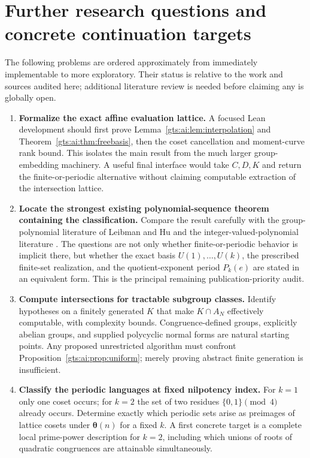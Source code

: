 \documentclass[11pt,letterpaper]{article}
\theoremstyle{definition}
\theoremstyle{remark}
\newcommand{\vv}{\boldsymbol\theta}
\begin{document}
\section{Further research questions and concrete continuation targets}\label{gts:ai:sec:questions}
The following problems are ordered approximately from immediately implementable to more exploratory. Their status is relative to the work and sources audited here; additional literature review is needed before claiming any is globally open.
\begin{enumerate}[label=\textbf{\arabic*.},leftmargin=*]
\item \textbf{Formalize the exact affine evaluation lattice.}
A focused Lean development should first prove Lemma~\ref{gts:ai:lem:interpolation} and Theorem~\ref{gts:ai:thm:freebasis}, then the coset cancellation and moment-curve rank bound. This isolates the main result from the much larger group-embedding machinery. A useful final interface would take $C,D,K$ and return the finite-or-periodic alternative without claiming computable extraction of the intersection lattice.

\item \textbf{Locate the strongest existing polynomial-sequence theorem containing the classification.}
Compare the result carefully with the group-polynomial literature of Leibman and Hu and the integer-valued-polynomial literature \cite{ai-leibman,ai-hu,ai-cahenchabert}. The questions are not only whether finite-or-periodic behavior is implicit there, but whether the exact basis $U(1),\ldots,U(k)$, the prescribed finite-set realization, and the quotient-exponent period $P_k(e)$ are stated in an equivalent form. This is the principal remaining publication-priority audit.

\item \textbf{Compute intersections for tractable subgroup classes.}
Identify hypotheses on a finitely generated $K$ that make $K\cap A_N$ effectively computable, with complexity bounds. Congruence-defined groups, explicitly abelian groups, and supplied polycyclic normal forms are natural starting points. Any proposed unrestricted algorithm must confront Proposition~\ref{gts:ai:prop:uniform}; merely proving abstract finite generation is insufficient.

\item \textbf{Classify the periodic languages at fixed nilpotency index.}
For $k=1$ only one coset occurs; for $k=2$ the set of two residues $\{0,1\}\pmod4$ already occurs. Determine exactly which periodic sets arise as preimages of lattice cosets under $\vv(n)$ for a fixed $k$. A first concrete target is a complete local prime-power description for $k=2$, including which unions of roots of quadratic congruences are attainable simultaneously.


\end{enumerate}
\end{document}
